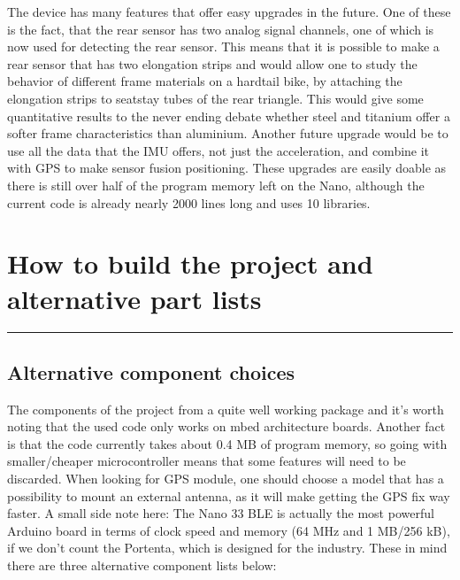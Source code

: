 \documentclass[a4paper,11pt]{article}
\begin{document}
The device has many features that offer easy upgrades in the future. One of these is the fact, that the rear sensor has two analog signal channels, one of which is now used for detecting the rear sensor. This means that it is possible to make a rear sensor that has two elongation strips and would allow one to study the behavior of different frame materials on a hardtail bike, by attaching the elongation strips to seatstay tubes of the rear triangle. This would give some quantitative results to the never ending debate whether steel and titanium offer a softer frame characteristics than aluminium. Another future upgrade would be to use all the data that the IMU offers, not just the acceleration, and combine it with GPS to make sensor fusion positioning. These upgrades are easily doable as there is still over half of the program memory left on the Nano, although the current code is already nearly 2000 lines long and uses 10 libraries.


\newpage
\section{How to build the project and alternative part lists}
\rule{12.7cm}{0.4pt}

\subsection{Alternative component choices}

The components of the project from a quite well working package and it's worth noting that the used code only works on mbed architecture boards. Another fact is that the code currently takes about 0.4 MB of program memory, so going with smaller/cheaper microcontroller means that some features will need to be discarded. When looking for GPS module, one should choose a model that has a possibility to mount an external antenna, as it will make getting the GPS fix way faster. A small side note here: The Nano 33 BLE is actually the most powerful Arduino board in terms of clock speed and memory (64 MHz and 1 MB/256 kB), if we don't count the Portenta, which is designed for the industry. These in mind there are three alternative component lists below:
\end{document}
